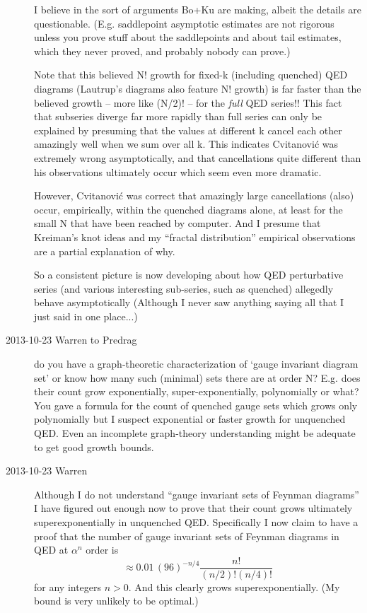\begin{description}
I believe in the sort of arguments Bo+Ku are making, albeit the
details are questionable.
(E.g. saddlepoint asymptotic estimates are not rigorous unless you prove stuff
about the saddlepoints and about tail estimates, which they never proved, and
probably nobody can prove.)

Note that this believed N! growth for fixed-k (including quenched) QED diagrams
(Lautrup's diagrams also feature N! growth) is far faster than the
believed growth -- more like (N/2)! -- for the \emph{full} QED series!!
This fact that subseries diverge far more rapidly than full series
can only be explained by presuming that
the values at different k cancel each other amazingly well when we sum
over all k.
This indicates Cvitanovi\'c was extremely wrong asymptotically, and that
cancellations
quite different than his observations ultimately occur which seem even
more dramatic.

However, Cvitanovi\'c was correct that amazingly large cancellations
(also) occur, empirically, within the quenched diagrams alone, at least
for the small N that have been reached by computer.   And I presume that
Kreiman's knot ideas and my ``fractal distribution''
empirical observations are a partial explanation of why.

So a consistent picture is now developing about how QED perturbative series (and
various interesting sub-series, such as quenched) allegedly behave
asymptotically
(Although I never saw anything saying all that I just said in one place...)

\item[2013-10-23  Warren to Predrag]  do you have a graph-theoretic
characterization of `gauge invariant diagram set' or know how many such
(minimal) sets there are at order N?   E.g. does their count grow
exponentially, super-exponentially, polynomially or what?  You gave a
formula for the count of quenched gauge sets which grows only polynomially
but I suspect exponential or faster growth for unquenched QED.  Even an
incomplete graph-theory understanding might be adequate to get good growth
bounds.

\item[2013-10-23 Warren]
Although I do not understand ``gauge invariant sets of Feynman diagrams''
I have figured out enough now to prove that their count grows ultimately
superexponentially in unquenched QED.  Specifically I now claim to have a
proof that the number of gauge invariant sets of Feynman diagrams in QED
at $\alpha^n$ order is
\[
  \approx 0.01\,(96)^{-n/4}\frac{n!}{(n/2)!  (n/4)!}
\]
for any integers $n>0$.
And this clearly grows superexponentially.
(My bound is very unlikely to be optimal.)


\end{description}

